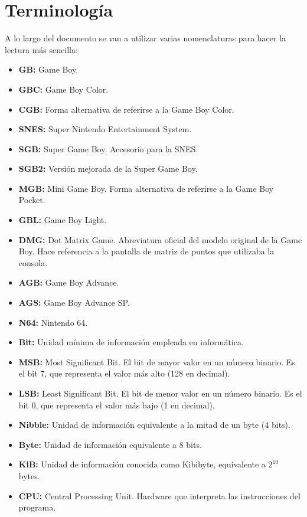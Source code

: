 \cleardoublepage

\chapter{Terminología}
\label{terminologia}
A lo largo del documento se van a utilizar varias nomenclaturas para hacer la lectura más sencilla:
\begin{itemize}
	\item \textbf{GB:} Game Boy.
    \item \textbf{GBC:} Game Boy Color.
    \item \textbf{CGB:} Forma alternativa de referirse a la Game Boy Color.
    \item \textbf{SNES:} Super Nintendo Entertainment System.
    \item \textbf{SGB:} Super Game Boy. Accesorio para la SNES.
    \item \textbf{SGB2:} Versión mejorada de la Super Game Boy.
    \item \textbf{MGB:} Mini Game Boy. Forma alternativa de referirse a la Game Boy Pocket.
    \item \textbf{GBL:} Game Boy Light.
    \item \textbf{DMG:} Dot Matrix Game. Abreviatura oficial del modelo original de la Game Boy. Hace referencia a la pantalla de matriz de puntos que utilizaba la consola.
    \item \textbf{AGB:} Game Boy Advance.
    \item \textbf{AGS:} Game Boy Advance SP.
    \item \textbf{N64:} Nintendo 64.
	\item \textbf{Bit:} Unidad mínima de información empleada en informática.
    \item \textbf{MSB:} Most Significant Bit. El bit de mayor valor en un número binario. Es el bit 7, que representa el valor más alto (128 en decimal).
    \item \textbf{LSB:} Least Significant Bit. El bit de menor valor en un número binario. Es el bit 0, que representa el valor más bajo (1 en decimal).
    \item \textbf{Nibble:} Unidad de información equivalente a la mitad de un byte (4 bits).
	\item \textbf{Byte:} Unidad de información equivalente a 8 bits.
    \item \textbf{KiB:} Unidad de información conocida como Kibibyte, equivalente a $2^{10}$ bytes.
	\item \textbf{CPU:} Central Processing Unit. Hardware que interpreta las instrucciones del programa.

\end{itemize}
